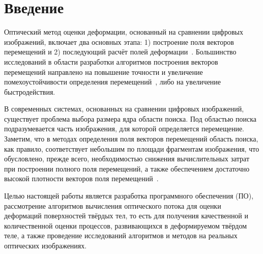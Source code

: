 \newpage
\section{Введение}



Оптический метод оценки деформации, основанный на сравнении цифровых изображений, включает два основных этапа: 1) построение поля векторов перемещений и 2) последующий расчёт полей деформации~\cite{pan_intro_one}. Большинство исследований в области разработки алгоритмов построения векторов перемещений направлено на повышение точности и увеличение помехоустойчивости определения перемещений~\cite{pan_intro_two, pan_intro_three}, либо на увеличение быстродействия.

В современных системах, основанных на сравнении цифровых изображений, существует проблема выбора размера ядра области поиска.
Под областью поиска подразумевается часть изображения, для которой определяется перемещение.
Заметим, что в методах определения поля векторов перемещений область поиска, как правило, соответствует небольшим по площади фрагментам изображения, что обусловлено, прежде всего, необходимостью снижения вычислительных затрат при построении полного поля перемещений, а также обеспечением достаточно высокой плотности векторов поля перемещений~\cite{tom_lyk, Lucas1981}.

Целью настоящей работы является разработка программного обеспечения (ПО), рассмотрение алгоритмов вычисления оптического потока для оценки деформаций поверхностей твёрдых тел, то есть для получения качественной и количественной оценки процессов, развивающихся в деформируемом твёрдом теле, а также проведение исследований алгоритмов и методов на реальных оптических изображениях.
